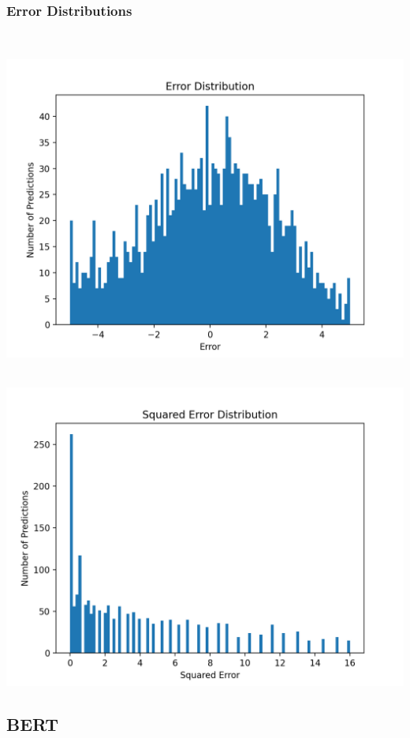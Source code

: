 \documentclass[11pt]{article}
\begin{document}
\subsubsection{Error Distributions}
\mbox{}\\
\begin{minipage}{0.45\textwidth}
\includegraphics[scale=0.5]{logistic_regression/error.png}
\end{minipage}
\hfill
\begin{minipage}{0.45\textwidth}
\mbox{}\\
\includegraphics[scale=0.5]{logistic_regression/squared_error.png}
\end{minipage}


\subsection{BERT}
\end{document}

